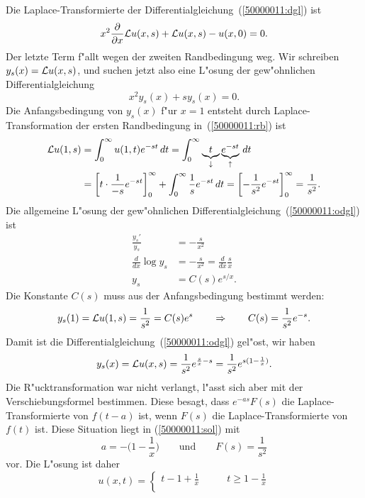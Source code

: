 \begin{loesung}
Die Laplace-Transformierte der Differentialgleichung~(\ref{50000011:dgl}) ist
\begin{equation}
x^2\frac{\partial}{\partial x}{\cal L}u(x,s) + {\cal L}u(x,s) - u(x,0)=0.
\end{equation}
Der letzte Term f"allt wegen der zweiten Randbedingung weg.
Wir schreiben $y_s(x)={\cal L}u(x,s)$, und suchen jetzt also eine L"osung
der gew"ohnlichen Differentialgleichung
\begin{equation}
x^2y_s(x) + sy_s(x)=0.
\label{50000011:odgl}
\end{equation}
Die Anfangsbedingung von $y_s(x)$ f"ur $x=1$ entsteht durch
Laplace-Transformation der ersten Randbedingung in~(\ref{50000011:rb}) ist
\begin{align*}
{\cal L}u(1,s)
&=
\int_0^\infty u(1,t)e^{-st}\,dt
=
\int_0^\infty \underbrace{t}_{\downarrow}\underbrace{e^{-st}}_{\uparrow}\,dt
\\
&=
\biggl[
t\cdot \frac1{-s}e^{-st}
\biggr]_0^\infty
+\int_0^\infty \frac1se^{-st}\,dt
=
\biggl[
-\frac1{s^2}e^{-st}
\biggr]_0^\infty=\frac1{s^2}.
\end{align*}
Die allgemeine L"osung der gew"ohnlichen Differentialgleichung~(\ref{50000011:odgl}) ist
\begin{align*}
\frac{y_s'}{y_s}&=-\frac{s}{x^2}
\\
\frac{d}{dx} \log y_s &= -\frac{s}{x^2}=\frac{d}{dx}\frac{s}{x}
\\
y_s&=C(s)e^{s/x}.
\end{align*}
Die Konstante $C(s)$ muss aus der Anfangsbedingung bestimmt werden:
\[
y_s(1)={\cal L}u(1,s)=\frac1{s^2}=C(s)e^{s}
\qquad\Rightarrow\qquad
C(s)=\frac1{s^2}e^{-s}.
\]
Damit ist die Differentialgleichung~(\ref{50000011:odgl}) gel"ost, wir haben
\begin{equation}
y_s(x)
=
{\cal L}u(x,s)
=
\frac1{s^2}e^{\frac{s}{x}-s}
=
\frac1{s^2}e^{s(1-\frac1x)}.
\label{50000011:sol}
\end{equation}
Die R"ucktransformation war nicht verlangt, l"asst sich aber mit der
Verschiebungsformel bestimmen.
Diese besagt, dass $e^{-as}F(s)$ die Laplace-Transformierte von 
$f(t-a)$ ist, wenn $F(s)$ die Laplace-Transformierte von $f(t)$ ist.
Diese Situation liegt in (\ref{50000011:sol}) mit
\[
a = -\biggl(1-\frac1x\biggr)
\qquad\text{und}\qquad
F(s)=\frac1{s^2}
\]
vor.
Die L"osung ist daher
\[
u(x,t)
=
\begin{cases}
t-1+\frac1x
&\qquad t \ge 1-\frac1x
\\

\end{cases}\]
\end{loesung}
